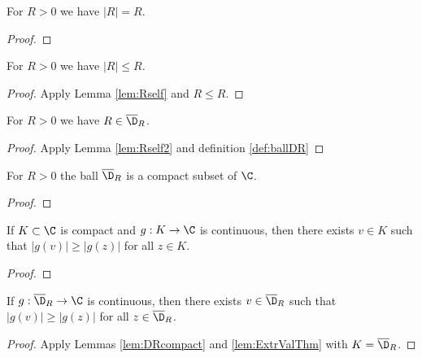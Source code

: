 \begin{lemma} \label{lem:Rself}  \leanok
For $R>0$ we have $|R|=R$.
\end{lemma}
\begin{proof} \leanok
\end{proof}

\begin{lemma}\label{lem:Rself2}  \leanok
For $R>0$ we have $|R|\le R$.
\end{lemma}
\begin{proof} \leanok
{}
Apply Lemma \ref{lem:Rself} and $R\le R$.
\end{proof}

\begin{lemma}\label{lem:Rself3}  \leanok
For $R>0$ we have $R\in \overline{\D}_R$.
\end{lemma}
\begin{proof} \leanok
{}
Apply Lemma \ref{lem:Rself2} and definition \ref{def:ballDR}
\end{proof}

\begin{lemma}[Compactness] \label{lem:DRcompact}  \leanok
For $R>0$ the ball $\overline{\D}_R$ is a compact subset of $\C$.
\end{lemma}
\begin{proof} \leanok
\end{proof}

\begin{lemma}[ExtrValThm] \label{lem:ExtrValThm}  \leanok
If $K\subset\C$ is compact and $g:K \to \C$ is continuous, then there exists $v\in K$ such that $|g(v)| \ge |g(z)|$ for all $z\in K$.
\end{lemma}
\begin{proof} \leanok
\end{proof}

\begin{lemma} \label{lem:ExtrValThmDR}  \leanok
If $g:\overline{\D}_R \to \C$ is continuous, then there exists $v\in \overline{\D}_R$ such that $|g(v)| \ge |g(z)|$ for all $z\in \overline{\D}_R$.
\end{lemma}
\begin{proof} \leanok
{}
Apply Lemmas \ref{lem:DRcompact} and \ref{lem:ExtrValThm} with $K=\overline{\D}_R$.
\end{proof}

